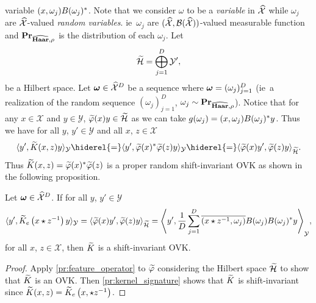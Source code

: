 variable $(x, \omega_j)B(\omega_j)^*$. Note that we consider
$\omega$ to be a \emph{variable} in $\widehat{\mathcal{X}}$ while $\omega_j$ are
$\widehat{\mathcal{X}}$-valued \emph{random variables}. \acs{ie}~$\omega_j$ are
$(\widehat{\mathcal{X}}, \mathcal{B}(\widehat{\mathcal{X}}))$-valued measurable
function and ${\mathbf{{Pr}}}_{\widehat{\mathbf{Haar}},\rho}$ is the distribution of each
$\omega_j$. Let
\begin{dmath*}
    \tildeH{\omega} = \Vect_{j=1}^D\mathcal{Y}',
\end{dmath*}
be a Hilbert space. Let $\boldsymbol{\mathbf{\omega}}\in\widehat{\mathcal{X}}^D$ be a sequence
where $\boldsymbol{\mathbf{\omega}}=(\omega_j)_{j=1}^D$ (\acs{ie}~a realization of the random
sequence $(\omega_j)_{j=1}^D$, $\omega_j \sim
{\mathbf{{Pr}}}_{\widehat{\mathbf{Haar}},\rho}$). Notice that for any $x\in\mathcal{X}$ and
$y\in\mathcal{Y}$, $\tildePhi{\omega}(x)y\in\tildeH{\omega}$ as we can take
$g(\omega_j)=(x,\omega_j)B(\omega_j)^* y$. Thus we have for all
$y$, $y'\in\mathcal{Y}$ and all $x$, $z\in\mathcal{X}$
\begin{dmath*}
    \inner{y', \tildeK{\omega}(x, z)y}_{\mathcal{Y}} \hiderel{=} \inner{y',
    \tildePhi{\omega}(x)^\adjoint \tildePhi{\omega}(z)y}_{\mathcal{Y}}
    \hiderel{=} \inner{\tildePhi{\omega}(x)y',
    \tildePhi{\omega}(z)y}_{\tildeH{\omega}}.
\end{dmath*}
Thus $\tildeK{\omega}(x,z)=\tildePhi{\omega}(x)^\adjoint \tildePhi{\omega}(z)$
is a proper random shift-invariant \acl{OVK} as shown in the following
proposition.
\begin{proposition}
    Let $\boldsymbol{\mathbf{\omega}}\in\widehat{\mathcal{X}}^D$. If for all $y$,
    $y'\in\mathcal{Y}$
    \begin{dmath*}
        \inner{y', \tildeK{\omega}_e\left(x\groupop
        z^{-1}\right)y}_{\mathcal{Y}}
        =\inner{\tildePhi{\omega}(x)y',
        \tildePhi{\omega}(z)y}_{\tildeH{\omega}}
        =\inner*{y', \frac{1}{D}\sum_{j=1}^D \conj{\pairing{x\groupop
        z^{-1},\omega_j}}B(\omega_j)B(\omega_j)^*y}_{\mathcal{Y}},
    \end{dmath*}
    for all $x$, $z\in\mathcal{X}$, then $\widetilde{K}$ is a shift-invariant
    \acl{OVK}.
\end{proposition}
\begin{proof}
    Apply \cref{pr:feature_operator} to $\tildePhi{\omega}$ considering the
    Hilbert space $\widetilde{\mathcal{H}}$ to show that $\widetilde{K}$ is an
    \acs{OVK}. Then \cref{pr:kernel_signature} shows that $\widetilde{K}$ is
    shift-invariant since
    $\widetilde{K}(x,z)=\widetilde{K}_e\left(x,\star z^{-1}\right)$.
\end{proof}
